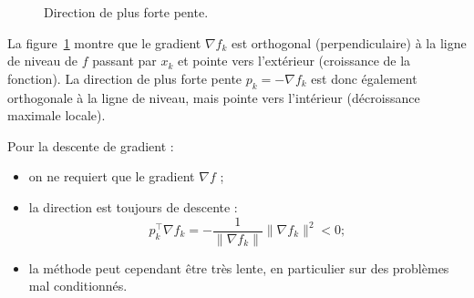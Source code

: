 \begin{figure}[H]
\centering
{}
\caption{Direction de plus forte pente.}
\label{fig:steepest-descent}
\end{figure}

\begin{figureexplanation}
La figure~\ref{fig:steepest-descent} montre que le gradient $\nabla f_k$ est orthogonal (perpendiculaire) à la ligne de niveau de $f$ passant par $x_k$ et pointe vers l'extérieur (croissance de la fonction). La direction de plus forte pente $p_k = -\nabla f_k$ est donc également orthogonale à la ligne de niveau, mais pointe vers l'intérieur (décroissance maximale locale).
\end{figureexplanation}

\begin{remarque}
Pour la descente de gradient :
\begin{itemize}
    \item on ne requiert que le gradient $\nabla f$ ;
    \item la direction est toujours de descente :
    \[
        p_k^\top \nabla f_k
        = -\frac{1}{\|\nabla f_k\|}\|\nabla f_k\|^2 < 0 ;
    \]
    \item la méthode peut cependant être très lente, en particulier sur des problèmes
    mal conditionnés.
\end{itemize}
\end{remarque}

